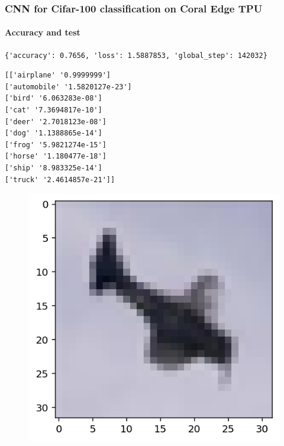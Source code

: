 \documentclass{beamer}
\begin{document}
\begin{frame}[fragile]
\frametitle{CNN for Cifar-100 classification on Coral Edge TPU}
\framesubtitle{Accuracy and test}
\begin{lstlisting}
{'accuracy': 0.7656, 'loss': 1.5887853, 'global_step': 142032}
\end{lstlisting}
\begin{lstlisting}
[['airplane' '0.9999999']
['automobile' '1.5820127e-23']
['bird' '6.063283e-08']
['cat' '7.3694817e-10']
['deer' '2.7018123e-08']
['dog' '1.1388865e-14']
['frog' '5.9821274e-15']
['horse' '1.180477e-18']
['ship' '8.983325e-14']
['truck' '2.4614857e-21']]
\end{lstlisting}
\vspace{-2mm}
\begin{figure}
	\centering
	\includegraphics[scale=0.4]{pictures/Classifica_immagine_casuale_Tensorflow1}
\end{figure}
\end{frame}
\end{document}
